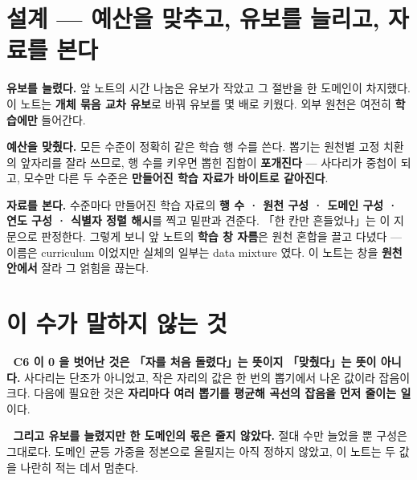 \documentclass[10pt]{article}
\begin{document}
\section{설계 --- 예산을 맞추고, 유보를 늘리고, 자료를 본다}

\textbf{유보를 늘렸다.} 앞 노트의 시간 나눔은 유보가 작았고 그 절반을 한 도메인이
차지했다. 이 노트는 \textbf{개체 묶음 교차 유보}로 바꿔 유보를 몇 배로 키웠다.
외부 원천은 여전히 \textbf{학습에만} 들어간다.

\textbf{예산을 맞췄다.} 모든 수준이 정확히 같은 학습 행 수를 쓴다.
뽑기는 원천별 고정 치환의 앞자리를 잘라 쓰므로, 행 수를 키우면 뽑힌 집합이
\textbf{포개진다} --- 사다리가 중첩이 되고, 모수만 다른 두 수준은
\textbf{만들어진 학습 자료가 바이트로 같아진다}.

\textbf{자료를 본다.} 수준마다 만들어진 학습 자료의
\textbf{행 수 · 원천 구성 · 도메인 구성 · 연도 구성 · 식별자 정렬 해시}를 찍고
밑판과 견준다. 「한 칸만 흔들었나」는 이 지문으로 판정한다.
그렇게 보니 앞 노트의 \textbf{학습 창 자름}은 원천 혼합을 끌고 다녔다 ---
이름은 curriculum 이었지만 실체의 일부는 data mixture 였다.
이 노트는 창을 \textbf{원천 안에서} 잘라 그 얽힘을 끊는다.



\section{이 수가 말하지 않는 것}

🔴 \textbf{C6 이 0 을 벗어난 것은 「자를 처음 돌렸다」는 뜻이지 「맞췄다」는 뜻이 아니다.}
사다리는 단조가 아니었고, 작은 자리의 값은 한 번의 뽑기에서 나온 값이라 잡음이 크다.
다음에 필요한 것은 \textbf{자리마다 여러 뽑기를 평균해 곡선의 잡음을 먼저 줄이는 일}이다.

🔴 \textbf{그리고 유보를 늘렸지만 한 도메인의 몫은 줄지 않았다.}
절대 수만 늘었을 뿐 구성은 그대로다. 도메인 균등 가중을 정본으로 올릴지는
아직 정하지 않았고, 이 노트는 두 값을 나란히 적는 데서 멈춘다.
\end{document}
